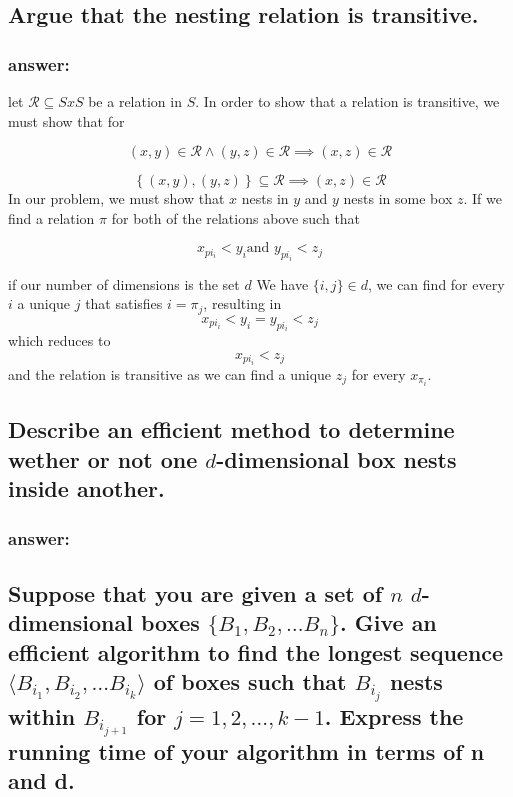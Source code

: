 \documentclass[titlepage]{article}\usepackage[]{graphicx}\usepackage[]{color}
\theoremstyle{definition}
\begin{document}
\subsection{Argue that the nesting relation is transitive.}
\subsubsection{answer:}
let $\mathcal R \subseteq S x S$ be a relation in $S$. 
In order to show that a relation is transitive, we must show that  for

\[ \left({x, y}\right) \in \mathcal R \land \left({y, z}\right) \in \mathcal R \implies \left({x, z}\right) \in \mathcal R \]

\[ \left\{ {\left({x, y}\right), \left({y, z}\right)}\right\} \subseteq \mathcal R \implies \left({x, z}\right) \in \mathcal R \]
In our problem, we must show that $x$ nests in $y$ and $y$ nests in some box
$z$. If we find a relation $\pi$ for both of the relations above such that

\[ x_{pi_i} < y_i \text{and } y_{pi_i} < z_j \]

if our number of dimensions is the set $d$
We have $ \{i,j\} \in d$, we can find for every $i$ a unique $j$ that satisfies
$i = \pi_j$, resulting in 
\[ x_{pi_i} < y_i =  y_{pi_i} < z_j \]
which reduces to 
\[ x_{pi_i} < z_j \]
and the relation is transitive as we can find a unique $z_j$ for every
$x_{\pi_i}$.



\subsection{Describe an efficient method to determine wether or not one
$d$-dimensional box nests inside another.}
\subsubsection{answer:}
\vspace{5cm}



\subsection{Suppose that you are given a set of $n$ $d$-dimensional boxes
  $\{B_1, B_2,\dots B_n\}$. Give an efficient algorithm to find the longest
  sequence $\langle B_{i_1}, B_{i_2},\dots B_{i_k}\rangle$ of boxes such that
  $B_{i_j}$ nests within  
  $B_{i_{j+1}}$ for $j = 1,2,\dots,k-1$. Express the running time of your
algorithm in terms of n and d.}
\end{document}
